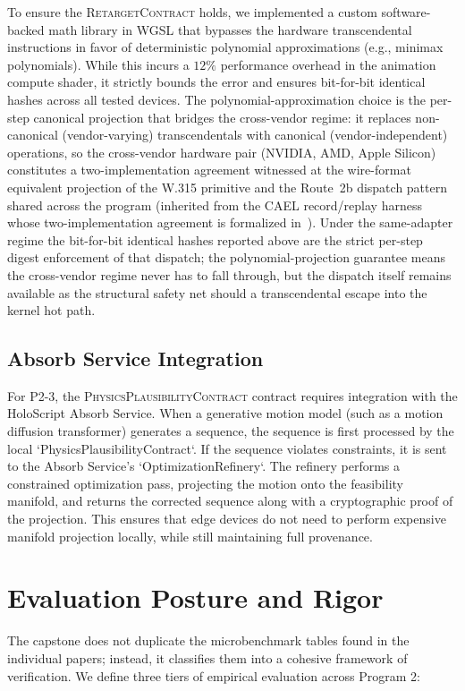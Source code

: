 \documentclass[sigconf,nonacm]{acmart}
\newcommand{\retargetcontract}{\textsc{RetargetContract}}
\newcommand{\plausibility}{\textsc{PhysicsPlausibilityContract}}
\begin{document}
To ensure the \retargetcontract{} holds, we implemented a custom software-backed
math library in WGSL that bypasses the hardware transcendental instructions in
favor of deterministic polynomial approximations (e.g., minimax polynomials).
While this incurs a $12\%$ performance overhead in the animation compute shader,
it strictly bounds the error and ensures bit-for-bit identical hashes across all
tested devices. The polynomial-approximation choice is the per-step canonical
projection that bridges the cross-vendor regime: it replaces non-canonical
(vendor-varying) transcendentals with canonical (vendor-independent) operations,
so the cross-vendor hardware pair (NVIDIA, AMD, Apple Silicon) constitutes a
two-implementation agreement witnessed at the wire-format equivalent
projection of the W.315 primitive and the Route~2b dispatch pattern shared
across the program (inherited from the CAEL record/replay harness whose
two-implementation agreement is formalized
in~\cite{paper-0c-twin-test-2026-05-11}). Under the same-adapter regime
the bit-for-bit identical hashes reported above are the strict per-step
digest enforcement of that dispatch; the polynomial-projection guarantee
means the cross-vendor regime never has to fall through, but the dispatch
itself remains available as the structural safety net should a
transcendental escape into the kernel hot path.

\subsection{Absorb Service Integration} For P2-3, the \plausibility{} contract
requires integration with the HoloScript Absorb Service. When a generative
motion model (such as a motion diffusion transformer) generates a sequence, the
sequence is first processed by the local `PhysicsPlausibilityContract`. If the
sequence violates constraints, it is sent to the Absorb Service's
`OptimizationRefinery`. The refinery performs a constrained optimization pass,
projecting the motion onto the feasibility manifold, and returns the corrected
sequence along with a cryptographic proof of the projection. This ensures that
edge devices do not need to perform expensive manifold projection locally, while
still maintaining full provenance.


\section{Evaluation Posture and Rigor}

The capstone does not duplicate the microbenchmark tables found in the individual papers; instead, it classifies them into a cohesive framework of verification. We define three tiers of empirical evaluation across Program 2:
\end{document}
